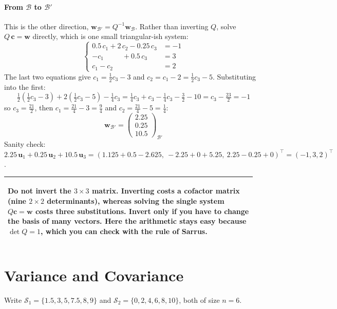 \documentclass[]{article}
\makeatletter
\newenvironment{simplify}{%
	\par\medskip\noindent
	\begin{tabular}{@{}p{0.965\linewidth}@{}}
		\hline\rule{0pt}{2.6ex}\itshape
}{%
		\\[0.6ex]\hline
	\end{tabular}
	\par\medskip
}
\makeatother
\begin{document}
	\paragraph{From $\mathcal{B}$ to $\mathcal{B}'$}\mbox{}

	This is the other direction, $\mathbf{w}_{\mathcal{B}'} = Q^{-1} \mathbf{w}_{\mathcal{B}}$.
	Rather than inverting $Q$, solve $Q\,\mathbf{c} = \mathbf{w}$ directly, which is one small triangular-ish system:
	$$
	\begin{cases}
		0.5\,c_1 + 2\,c_2 - 0.25\,c_3 &= -1 \\
		-c_1 \phantom{{}+2c_2} + 0.5\,c_3 &= 3 \\
		c_1 - c_2 \phantom{{}+0.5c_3} &= 2
	\end{cases}
	$$
	The last two equations give $c_1 = \tfrac{1}{2}c_3 - 3$ and $c_2 = c_1 - 2 = \tfrac{1}{2}c_3 - 5$.
	Substituting into the first:
	$$
	\tfrac{1}{2}\left(\tfrac{1}{2}c_3 - 3\right) + 2\left(\tfrac{1}{2}c_3 - 5\right) - \tfrac{1}{4}c_3
	= \tfrac{1}{4}c_3 + c_3 - \tfrac{1}{4}c_3 - \tfrac{3}{2} - 10
	= c_3 - \tfrac{23}{2} = -1
	$$
	so $c_3 = \tfrac{21}{2}$, then $c_1 = \tfrac{21}{4} - 3 = \tfrac{9}{4}$ and $c_2 = \tfrac{21}{4} - 5 = \tfrac{1}{4}$:
	$$
	\mathbf{w}_{\mathcal{B}'} = \begin{pmatrix} 2.25 \\ 0.25 \\ 10.5 \end{pmatrix}_{\mathcal{B}'}
	$$
	Sanity check: $2.25\,\mathbf{u}_1 + 0.25\,\mathbf{u}_2 + 10.5\,\mathbf{u}_3 = (1.125 + 0.5 - 2.625,\ -2.25 + 0 + 5.25,\ 2.25 - 0.25 + 0)^\top = (-1, 3, 2)^\top$.

	\begin{simplify}
		Do not invert the $3\times3$ matrix.
		Inverting costs a cofactor matrix (nine $2\times2$ determinants), whereas solving the single system $Q\mathbf{c}=\mathbf{w}$ costs three substitutions.
		Invert only if you have to change the basis of many vectors.
		Here the arithmetic stays easy because $\det Q = 1$, which you can check with the rule of Sarrus.
	\end{simplify}

	\section{Variance and Covariance}

	Write $\mathcal{S}_1 = \{1.5, 3, 5, 7.5, 8, 9\}$ and $\mathcal{S}_2 = \{0, 2, 4, 6, 8, 10\}$, both of size $n = 6$.
\end{document}
